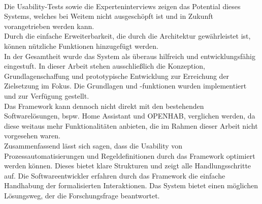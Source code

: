     \\
    \linebreak
    Die Usability-Tests sowie die Experteninterviews zeigen das Potential dieses Systems, welches bei Weitem nicht ausgeschöpft ist 
    und in Zukunft vorangetrieben werden kann. 
    \\
    \linebreak
    Durch die einfache Erweiterbarkeit, die durch die Architektur gewährleistet ist, können nützliche Funktionen hinzugefügt 
    werden. 
    \\
    In der Gesamtheit wurde das System als überaus hilfreich und entwicklungsfähig eingestuft. In dieser Arbeit stehen ausschließlich die 
    Konzeption, Grundlagenschaffung und prototypische Entwicklung zur Erreichung der Zielsetzung im Fokus. Die Grundlagen und -funktionen 
    wurden implementiert und zur Verfügung gestellt.
    \\
    \linebreak
    Das Framework kann dennoch nicht direkt mit den bestehenden Softwarelösungen, bspw. Home Assistant und \acs{OPENHAB}, verglichen 
    werden, da diese weitaus mehr Funktionalitäten anbieten, die im Rahmen dieser Arbeit nicht vorgesehen waren. 
    \\
    \linebreak
    Zusammenfassend lässt sich sagen, dass die Usability von Prozessautomatisierungen und Regeldefinitionen durch das Framework 
    optimiert werden können. Dieses bietet klare Strukturen und zeigt alle Handlungsschritte auf. Die Softwareentwickler erfahren 
    durch das Framework die einfache Handhabung der formalisierten Interaktionen. Das System bietet einen möglichen Lösungsweg, 
    der die Forschungsfrage beantwortet. 